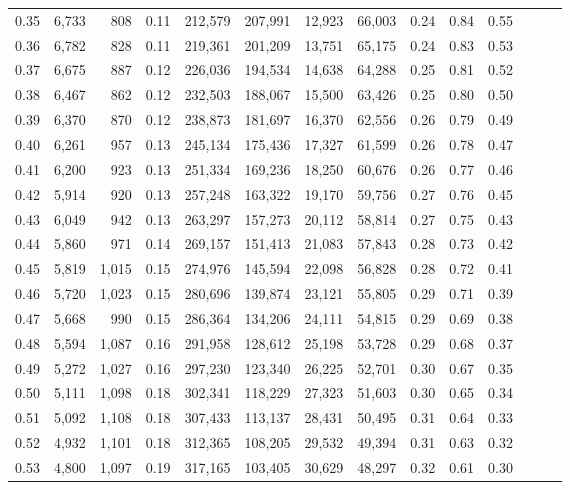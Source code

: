 \begin{tabular}{rrrrrrrrrrrrrr}
0.35 &  6,733 &    808 &  0.11 &  212,579 &  207,991 &  12,923 &  66,003 &  0.24 &  0.84 &      0.55 \\
0.36 &  6,782 &    828 &  0.11 &  219,361 &  201,209 &  13,751 &  65,175 &  0.24 &  0.83 &      0.53 \\
0.37 &  6,675 &    887 &  0.12 &  226,036 &  194,534 &  14,638 &  64,288 &  0.25 &  0.81 &      0.52 \\
0.38 &  6,467 &    862 &  0.12 &  232,503 &  188,067 &  15,500 &  63,426 &  0.25 &  0.80 &      0.50 \\
0.39 &  6,370 &    870 &  0.12 &  238,873 &  181,697 &  16,370 &  62,556 &  0.26 &  0.79 &      0.49 \\
0.40 &  6,261 &    957 &  0.13 &  245,134 &  175,436 &  17,327 &  61,599 &  0.26 &  0.78 &      0.47 \\
0.41 &  6,200 &    923 &  0.13 &  251,334 &  169,236 &  18,250 &  60,676 &  0.26 &  0.77 &      0.46 \\
0.42 &  5,914 &    920 &  0.13 &  257,248 &  163,322 &  19,170 &  59,756 &  0.27 &  0.76 &      0.45 \\
0.43 &  6,049 &    942 &  0.13 &  263,297 &  157,273 &  20,112 &  58,814 &  0.27 &  0.75 &      0.43 \\
0.44 &  5,860 &    971 &  0.14 &  269,157 &  151,413 &  21,083 &  57,843 &  0.28 &  0.73 &      0.42 \\
0.45 &  5,819 &  1,015 &  0.15 &  274,976 &  145,594 &  22,098 &  56,828 &  0.28 &  0.72 &      0.41 \\
0.46 &  5,720 &  1,023 &  0.15 &  280,696 &  139,874 &  23,121 &  55,805 &  0.29 &  0.71 &      0.39 \\
0.47 &  5,668 &    990 &  0.15 &  286,364 &  134,206 &  24,111 &  54,815 &  0.29 &  0.69 &      0.38 \\
0.48 &  5,594 &  1,087 &  0.16 &  291,958 &  128,612 &  25,198 &  53,728 &  0.29 &  0.68 &      0.37 \\
0.49 &  5,272 &  1,027 &  0.16 &  297,230 &  123,340 &  26,225 &  52,701 &  0.30 &  0.67 &      0.35 \\
0.50 &  5,111 &  1,098 &  0.18 &  302,341 &  118,229 &  27,323 &  51,603 &  0.30 &  0.65 &      0.34 \\
0.51 &  5,092 &  1,108 &  0.18 &  307,433 &  113,137 &  28,431 &  50,495 &  0.31 &  0.64 &      0.33 \\
0.52 &  4,932 &  1,101 &  0.18 &  312,365 &  108,205 &  29,532 &  49,394 &  0.31 &  0.63 &      0.32 \\
0.53 &  4,800 &  1,097 &  0.19 &  317,165 &  103,405 &  30,629 &  48,297 &  0.32 &  0.61 &      0.30 \\

\end{tabular}
